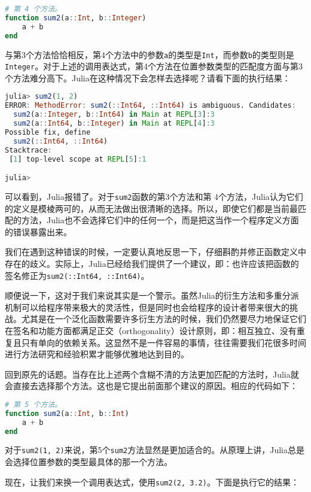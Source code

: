 \begin{lstlisting}[language=julia]
# 第 4 个方法。
function sum2(a::Int, b::Integer)
    a + b
end
\end{lstlisting}

与第3个方法恰恰相反，第4个方法中的参数\verb`a`的类型是\verb`Int`，而参数\verb`b`的类型则是\verb`Integer`。对于上述的调用表达式，第4个方法在位置参数类型的匹配度方面与第3个方法难分高下。Julia在这种情况下会怎样去选择呢？请看下面的执行结果：

\begin{lstlisting}[language=julia]
julia> sum2(1, 2)
ERROR: MethodError: sum2(::Int64, ::Int64) is ambiguous. Candidates:
  sum2(a::Integer, b::Int64) in Main at REPL[3]:3
  sum2(a::Int64, b::Integer) in Main at REPL[4]:3
Possible fix, define
  sum2(::Int64, ::Int64)
Stacktrace:
 [1] top-level scope at REPL[5]:1

julia> 
\end{lstlisting}

可以看到，Julia报错了。对于\verb`sum2`函数的第3个方法和第 4个方法，Julia认为它们的定义是模棱两可的，从而无法做出很清晰的选择。所以，即使它们都是当前最匹配的方法，Julia也不会选择它们中的任何一个，而是把这当作一个程序定义方面的错误暴露出来。

我们在遇到这种错误的时候，一定要认真地反思一下，仔细斟酌并修正函数定义中存在的歧义。实际上，Julia已经给我们提供了一个建议，即：也许应该把函数的签名修正为\verb`sum2(::Int64, ::Int64)`。

顺便说一下，这对于我们来说其实是一个警示。虽然Julia的衍生方法和多重分派机制可以给程序带来极大的灵活性，但是同时也会给程序的设计者带来很大的挑战。尤其是在一个泛化函数需要许多衍生方法的时候，我们仍然要尽力地保证它们在签名和功能方面都满足正交（orthogonality）设计原则，即：相互独立、没有重复且只有单向的依赖关系。这显然不是一件容易的事情，往往需要我们花很多时间进行方法研究和经验积累才能够优雅地达到目的。

回到原先的话题。当存在比上述两个含糊不清的方法更加匹配的方法时，Julia就会直接去选择那个方法。这也是它提出前面那个建议的原因。相应的代码如下：

\begin{lstlisting}[language=julia]
# 第 5 个方法。
function sum2(a::Int, b::Int)
    a + b
end
\end{lstlisting}

对于\verb`sum2(1, 2)`来说，第5个\verb`sum2`方法显然是更加适合的。从原理上讲，Julia总是会选择位置参数的类型最具体的那一个方法。

现在，让我们来换一个调用表达式，使用\verb`sum2(2, 3.2)`。下面是执行它的结果：

